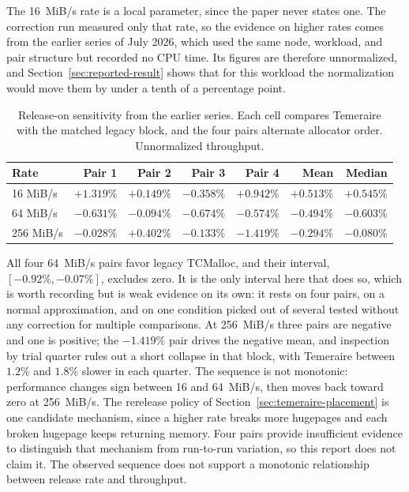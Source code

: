 \documentclass[sigconf]{acmart}
\begin{document}
The 16~MiB/s rate is a local parameter, since the paper never states one. The
correction run measured only that rate, so the evidence on higher rates comes
from the earlier series of July 2026, which used the same node, workload, and
pair structure but recorded no CPU time. Its figures are therefore unnormalized,
and Section~\ref{sec:reported-result} shows that for this workload the
normalization would move them by under a tenth of a percentage point.

\begin{table}[ht]
\caption{Release-on sensitivity from the earlier series. Each cell compares
Temeraire with the matched legacy block, and the four pairs alternate allocator
order. Unnormalized throughput.}
\label{tab:sensitivity}
\footnotesize
\begin{tabular}{@{}lrrrrrr@{}}
\toprule
Rate & Pair 1 & Pair 2 & Pair 3 & Pair 4 & Mean & Median \\
\midrule
16 MiB/s  & $+1.319\%$ & $+0.149\%$ & $-0.358\%$ & $+0.942\%$ & $+0.513\%$ & $+0.545\%$ \\
64 MiB/s  & $-0.631\%$ & $-0.094\%$ & $-0.674\%$ & $-0.574\%$ & $-0.494\%$ & $-0.603\%$ \\
256 MiB/s & $-0.028\%$ & $+0.402\%$ & $-0.133\%$ & $-1.419\%$ & $-0.294\%$ & $-0.080\%$ \\
\bottomrule
\end{tabular}
\end{table}

All four 64~MiB/s pairs favor legacy TCMalloc, and their interval,
$[-0.92\%,-0.07\%]$, excludes zero. It is the only interval here that does so,
which is worth recording but is weak evidence on its own: it rests on four
pairs, on a normal approximation, and on one condition picked out of several
tested without any correction for multiple comparisons. At 256~MiB/s three pairs
are negative and one is positive; the $-1.419\%$ pair drives the negative mean,
and inspection by trial quarter rules out a short collapse in that block, with
Temeraire between $1.2\%$ and $1.8\%$ slower in each quarter. The sequence is not monotonic: performance changes sign between 16 and
64~MiB/s, then moves back toward zero at 256~MiB/s. The rerelease policy of
Section~\ref{sec:temeraire-placement} is one candidate mechanism, since a
higher rate breaks more hugepages and each broken hugepage keeps returning
memory. Four pairs provide insufficient evidence to distinguish that mechanism
from run-to-run variation, so this report does not claim it. The observed
sequence does not support a monotonic relationship between release rate and
throughput.
\end{document}
